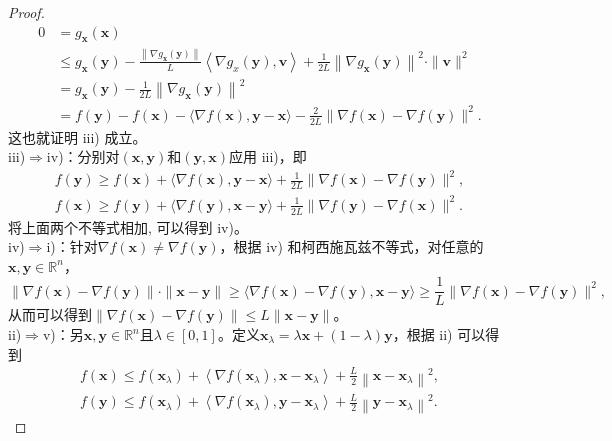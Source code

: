 \begin{proof}
\begin{equation}
\begin{aligned}
0 &=g_{\bm{x}}(\bm{x}) \\
& \leq g_{\bm{x}}(\bm{y})-\frac{\left\|\nabla g_{\bm{x}}(\bm{y})\right\|}{L}\left\langle\nabla g_{x}(\bm{y}), \bm{v}\right\rangle+\frac{1}{2 L}\left\|\nabla g_{\bm{x}}(\bm{y})\right\|^{2} \cdot\|\bm{v}\|^{2} \\
&=g_{\bm{x}}(\bm{y})-\frac{1}{2 L}\left\|\nabla g_{\bm{x}}(\bm{y})\right\|^{2} \\
&=f(\bm{y})-f(\bm{x})-\langle\nabla f(\bm{x}), \bm{y}-\bm{x}\rangle-\frac{2}{2 L}\|\nabla f(\bm{x})-\nabla f(\bm{y})\|^{2} .
    \end{aligned}
    \nonumber
\end{equation}
这也就证明 iii) 成立。\\
iii)$ \Rightarrow  $iv)：分别对$  (\bm{x}, \bm{y})  $和$  (\bm{y}, \bm{x})  $应用 iii)，即
\begin{equation}
\begin{array}{l}
f(\bm{y}) \geq f(\bm{x})+\langle\nabla f(\bm{x}), \bm{y}-\bm{x}\rangle+\frac{1}{2 L}\|\nabla f(\bm{x})-\nabla f(\bm{y})\|^{2} ,\\
f(\bm{x}) \geq f(\bm{y})+\langle\nabla f(\bm{y}), \bm{x}-\bm{y}\rangle+\frac{1}{2 L}\|\nabla f(\bm{y})-\nabla f(\bm{x})\|^{2} .
\end{array}
    \nonumber
\end{equation}
将上面两个不等式相加, 可以得到 iv)。 \\
iv)$  \Rightarrow  $i)：针对$  \nabla f(\bm{x}) \neq \nabla f(\bm{y}) $，根据 iv) 和柯西施瓦兹不等式，对任意的$\bm{x}, \bm{y} \in \mathbb{R}^{n}$，
\begin{equation}
\|\nabla f(\bm{x})-\nabla f(\bm{y})\| \cdot\|\bm{x}-\bm{y}\| \geq\langle\nabla f(\bm{x})-\nabla f(\bm{y}), \bm{x}-\bm{y}\rangle \geq \frac{1}{L}\|\nabla f(\bm{x})-\nabla f(\bm{y})\|^{2} ,
    \nonumber
\end{equation}
从而可以得到$  \|\nabla f(\bm{x})-\nabla f(\bm{y})\| \leq L\|\bm{x}-\bm{y}\|  $。 \\
ii)$  \Rightarrow $v)：另$  \bm{x}, \bm{y} \in \mathbb{R}^{n}  $且$  \lambda \in[0,1]  $。定义$  \bm{x}_{\lambda}=\lambda \bm{x}+(1-\lambda) \bm{y} $，根据 ii) 可以得到
\begin{equation}
\begin{array}{l}
f(\bm{x}) \leq f\left(\bm{x}_{\lambda}\right)+\left\langle\nabla f\left(\bm{x}_{\lambda}\right), \bm{x}-\bm{x}_{\lambda}\right\rangle+\frac{L}{2}\left\|\bm{x}-\bm{x}_{\lambda}\right\|^{2}, \\
f(\bm{y}) \leq f\left(\bm{x}_{\lambda}\right)+\left\langle\nabla f\left(\bm{x}_{\lambda}\right), \bm{y}-\bm{x}_{\lambda}\right\rangle+\frac{L}{2}\left\|\bm{y}-\bm{x}_{\lambda}\right\|^{2} .

\end{array}
\end{equation}
\end{proof}
